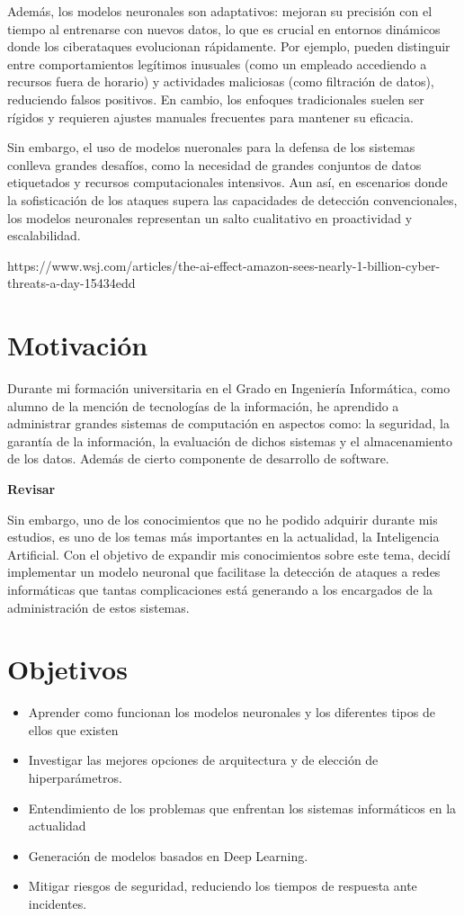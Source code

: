 Además, los modelos neuronales son adaptativos: mejoran su precisión con el tiempo al entrenarse con nuevos datos, lo que es crucial en entornos dinámicos donde los ciberataques evolucionan rápidamente. Por ejemplo, pueden distinguir entre comportamientos legítimos inusuales (como un empleado accediendo a recursos fuera de horario) y actividades maliciosas (como filtración de datos), reduciendo falsos positivos. En cambio, los enfoques tradicionales suelen ser rígidos y requieren ajustes manuales frecuentes para mantener su eficacia.

Sin embargo, el uso de modelos nueronales para la defensa de los sistemas conlleva grandes desafíos, como la necesidad de grandes conjuntos de datos etiquetados y recursos computacionales intensivos. Aun así, en escenarios donde la sofisticación de los ataques supera las capacidades de detección convencionales, los modelos neuronales representan un salto cualitativo en proactividad y escalabilidad. 


https://www.wsj.com/articles/the-ai-effect-amazon-sees-nearly-1-billion-cyber-threats-a-day-15434edd


\section{Motivación} \label{sec.motivacion}
Durante mi formación universitaria en el Grado en Ingeniería Informática, como alumno 
de la mención de tecnologías de la información, he aprendido a administrar grandes sistemas de computación en aspectos como: la seguridad, la garantía de la información, la evaluación de dichos sistemas y el almacenamiento de los datos. Además de cierto componente de desarrollo de software.

\textbf{Revisar}

Sin embargo, uno de los conocimientos que no he podido adquirir durante mis estudios, es uno de los temas más importantes en la actualidad, la Inteligencia Artificial. Con el objetivo de expandir mis conocimientos sobre este tema, decidí implementar un modelo neuronal que facilitase la detección de ataques a redes informáticas que tantas complicaciones está generando a los encargados de la administración de estos sistemas.

 
\section{Objetivos} \label{sec.objetivos}

\begin{itemize}
\item Aprender como funcionan los modelos neuronales y los diferentes tipos de ellos que existen
\item Investigar las mejores opciones de arquitectura y de elección de hiperparámetros.
\item Entendimiento de los problemas que enfrentan los sistemas informáticos en la actualidad
\item Generación de modelos basados en Deep Learning.
\item Mitigar riesgos de seguridad, reduciendo los tiempos de respuesta ante incidentes.

\end{itemize}


